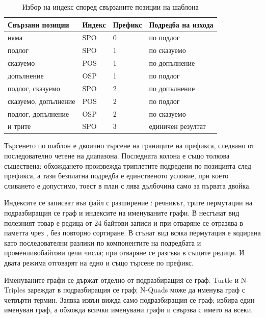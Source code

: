 \begin{table}[htbp]
\caption{Избор на индекс според свързаните позиции на шаблона}
\label{tab:index-choice}
\centering
\fontsize{10}{12}\selectfont
\begin{tabular}{@{}L{3.4cm}L{1.6cm}L{2.0cm}L{3.9cm}@{}}
\toprule
\textbf{Свързани позиции} & \textbf{Индекс} & \textbf{Префикс} & \textbf{Подредба на изхода} \\
\midrule
няма             & SPO & 0 & по подлог \\
подлог           & SPO & 1 & по сказуемо \\
сказуемо         & POS & 1 & по допълнение \\
допълнение       & OSP & 1 & по подлог \\
подлог, сказуемо & SPO & 2 & по допълнение \\
сказуемо, допълнение & POS & 2 & по подлог \\
подлог, допълнение & OSP & 2 & по сказуемо \\
и трите          & SPO & 3 & единичен резултат \\
\bottomrule
\end{tabular}
\end{table}

Търсенето по шаблон е двоично търсене на границите на префикса, следвано от последователно
четене на диапазона. Последната колона е също толкова съществена: обхождането произвежда
триплетите подредени по позицията след префикса, а тази безплатна подредба е единственото
условие, при което сливането е допустимо, тоест в план с лява дълбочина само за първата двойка.

Индексите се записват във файл с разширение : речникът, трите пермутации на
подразбиращия се граф и индексите на именуваните графи. В несгънат вид полезният товар е
редица от 24-байтови записи и при отваряне се отразява в паметта чрез , без
повторно сортиране. В сгънат вид всяка пермутация е кодирана като последователни разлики по
компонентите на подредбата и променливобайтови цели числа; при отваряне се разгъва в същите
редици. И двата режима отговарят на едно и също търсене по префикс.

Именуваните графи се държат отделно от подразбиращия се граф. Turtle и N-Triples зареждат в
подразбиращия се граф; N-Quads може да именува граф с четвърти термин. Заявка извън
 вижда само подразбиращия се граф;  избира един именуван граф,
а  обхожда всички именувани графи и свързва  с името на всеки.

